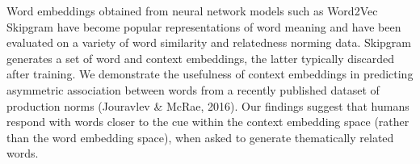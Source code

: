 Word embeddings obtained from neural network models such as Word2Vec Skipgram have become popular representations of word meaning and have been evaluated on a variety of word similarity and relatedness norming data. Skipgram generates a set of word and context embeddings, the latter typically discarded after training. We demonstrate the usefulness of context embeddings in predicting asymmetric association between words from a recently published dataset of production norms (Jouravlev \& McRae, 2016). Our findings suggest that humans respond with words closer to the cue within the context embedding space (rather than the word embedding space), when asked to generate thematically related words.
